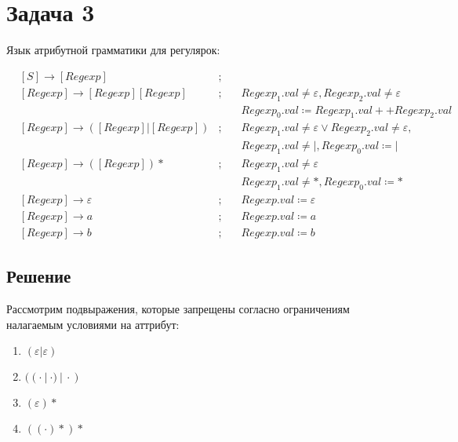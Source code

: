 \documentclass[a4paper, 14pt]{article}
\begin{document}
\newpage 

\section{Задача 3}

Язык атрибутной грамматики для регулярок:

$$
\begin{aligned}
  &[S] \rightarrow [Regexp] &;  \quad  \\
  &[Regexp] \rightarrow [Regexp][Regexp] &; \quad  &{Regexp_{1}.val \neq \varepsilon, Regexp_{2}.val \neq \varepsilon} \\
  & & \quad &{Regexp_{0}.val \coloneqq Regexp_{1}.val ++ Regexp_{2}.val}\\
  &[Regexp] \rightarrow ([Regexp]|[Regexp]) &; \quad &{Regexp_{1}.val \neq \varepsilon \lor Regexp_{2}.val \neq \varepsilon}, \\
  & & \quad &{Regexp_{1}.val \neq |}, Regexp_{0}.val \coloneqq | \\
  &[Regexp] \rightarrow ([Regexp])* &; \quad &{Regexp_{1}.val \neq \varepsilon}\\
  & & \quad &{Regexp_{1}.val \neq *}, Regexp_{0}.val \coloneqq * \\
  &[Regexp] \rightarrow \varepsilon &; \quad &{Regexp.val \coloneqq \varepsilon} \\
  &[Regexp] \rightarrow a &;  \quad &{Regexp.val \coloneqq a} \\
  &[Regexp] \rightarrow b &; \quad  &{Regexp.val \coloneqq b}
\end{aligned}
$$



\subsection{Решение}

Рассмотрим подвыражения, которые запрещены согласно ограничениям налагаемым условиями на аттрибут:

\begin{enumerate}
  \item{$(\varepsilon | \varepsilon)$}
  \item{$((\cdot \ | \ \cdot )\ | \ \cdot)$}
  \item{$(\varepsilon)*$}
  \item{$((\cdot)*)*$}
    
  
\end{enumerate}
\end{document}
